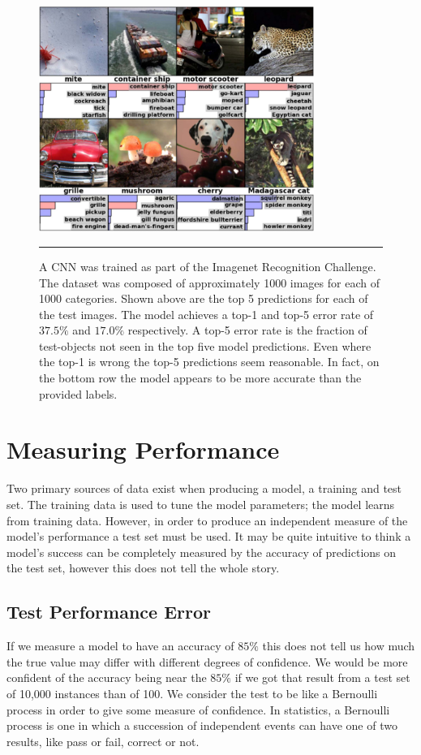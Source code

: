 \begin{figure}[htbp]
	\centering
		\includegraphics[width = 0.8\textwidth]{./Figures/CNN_image_prediction_krizehevvsky_nips_2012.jpg} %
		\rule{35em}{0.5pt}
	\caption[Image Recognition]{A CNN was trained as part of the Imagenet Recognition Challenge\citep{deng2012imagenet}. The dataset was composed of approximately 1000 images for each of 1000 categories. Shown above are the top 5 predictions for each of the test images. The model achieves a top-1 and top-5 error rate of $37.5\%$ and $17.0\%$ respectively. A top-5 error rate is the fraction of test-objects not seen in the top five model predictions. Even where the top-1 is wrong the top-5 predictions seem reasonable. In fact, on the bottom row the model appears to be more accurate than the provided labels.}
	\label{fig:Image_predication}
\end{figure}

\section{Measuring Performance}
Two primary sources of data exist when producing a model, a training and test set.
The training data is used to tune the model parameters; the model learns from training data.
However, in order to produce an independent measure of the model's performance a test set must be used.
It may be quite intuitive to think a model's success can be completely measured by the accuracy of predictions on the test set, however this does not tell the whole story.

\subsection{Test Performance Error}
If we measure a model to have an accuracy of $85\%$ this does not tell us how much the true value may differ with different degrees of confidence.
We would be more confident of the accuracy being near the $85\%$ if we got that result from a test set of 10,000 instances than of 100.
We consider the test to be like a Bernoulli process in order to give some measure of confidence.
In statistics, a Bernoulli process is one in which a succession of independent events can have one of two results, like pass or fail, correct or not.

